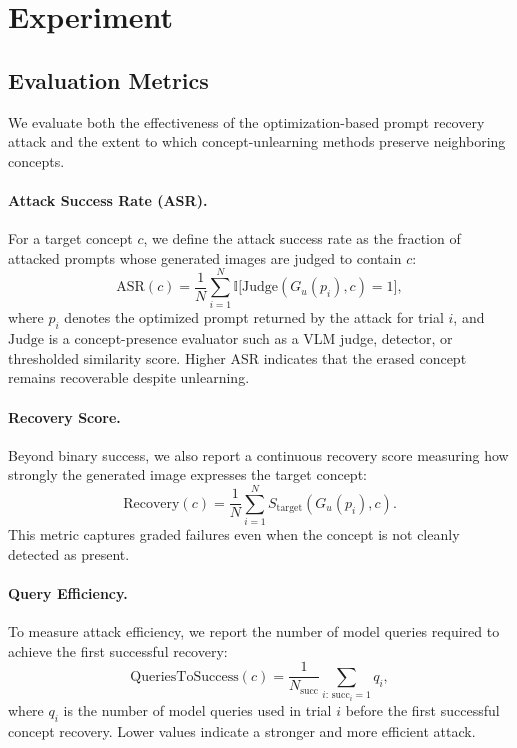 \newpage

\section{Experiment}
\label{sec:experiment}


\subsection{Evaluation Metrics}
\label{subsec:attack_metrics}

We evaluate both the effectiveness of the optimization-based prompt recovery attack and the extent to which concept-unlearning methods preserve neighboring concepts.

\paragraph{Attack Success Rate (ASR).}
For a target concept $c$, we define the attack success rate as the fraction of attacked prompts whose generated images are judged to contain $c$:
\begin{equation}
\mathrm{ASR}(c) = \frac{1}{N} \sum_{i=1}^{N} \mathbb{I}\bigl[\mathrm{Judge}(G_u(p_i), c) = 1 \bigr],
\end{equation}
where $p_i$ denotes the optimized prompt returned by the attack for trial $i$, and $\mathrm{Judge}$ is a concept-presence evaluator such as a VLM judge, detector, or thresholded similarity score. Higher ASR indicates that the erased concept remains recoverable despite unlearning.

\paragraph{Recovery Score.}
Beyond binary success, we also report a continuous recovery score measuring how strongly the generated image expresses the target concept:
\begin{equation}
\mathrm{Recovery}(c) = \frac{1}{N}\sum_{i=1}^{N} S_{\mathrm{target}}(G_u(p_i), c).
\end{equation}
This metric captures graded failures even when the concept is not cleanly detected as present.

\paragraph{Query Efficiency.}
To measure attack efficiency, we report the number of model queries required to achieve the first successful recovery:
\begin{equation}
\mathrm{QueriesToSuccess}(c) = \frac{1}{N_{\mathrm{succ}}} \sum_{i:\,\mathrm{succ}_i=1} q_i,
\end{equation}
where $q_i$ is the number of model queries used in trial $i$ before the first successful concept recovery. Lower values indicate a stronger and more efficient attack.

